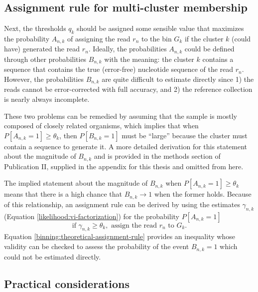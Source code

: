 \documentclass[officiallayout]{tktla}
\begin{document}
\subsection{Assignment rule for multi-cluster membership}

Next, the thresholds $q_{k}$ should be assigned some sensible value
that maximizes the probability $A_{n, k}$ of assigning the read
$r_{n}$ to the bin $G_{k}$ if the cluster $k$ (could have) generated
the read $r_{n}$. Ideally, the probabilities $A_{n, k}$ could be
defined through other probabilities $B_{n, k}$ with the meaning: the
cluster $k$ contains a sequence that contains the true (error-free)
nucleotide sequence of the read $r_{n}$. However, the probabilities
$B_{n, k}$ are quite difficult to estimate directly since 1) the reads
cannot be error-corrected with full accuracy, and 2) the reference
collection is nearly always incomplete.

These two problems can be remedied by assuming that the sample is
mostly composed of closely related organisms, which implies that when
$P\left[A_{n, k} = 1\right] \geq \theta_{k}$, then $P\left[B_{n, k} =
  1\right]$ must be ``large'' because the cluster must contain a
sequence to generate it. A more detailed derivation for this statement
about the magnitude of $B_{n, k}$ and is provided in the methods
section of Publication II, supplied in the appendix for this thesis
and omitted from here.

The implied statement about the magnitude of $B_{n, k}$ when
$P\left[A_{n, k} = 1\right] \geq \theta_{k}$ means that there is a
high chance that $B_{n, k} \rightarrow 1$ when the former
holds. Because of this relationship, an assignment rule can be derived
by using the estimates $\gamma_{n, k}$ (Equation
\ref{likelihood:vi-factorization}) for the probability $P\left[A_{n,
    k} = 1\right]$
\begin{equation}
  \label{binning:theoretical-assignment-rule}
  \text{if } \gamma_{n, k} \geq \theta_{k}, \text{ assign the read } r_{n} \text{ to } G_{k}.
\end{equation}
Equation \ref{binning:theoretical-assignment-rule} provides an
inequality whose validity can be checked to assess the probability of
the event $B_{n, k} = 1$ which could not be estimated directly.

\subsection{Practical considerations}
\end{document}
